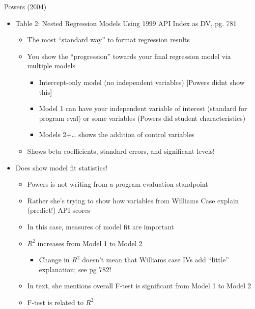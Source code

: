 \documentclass[
  8pt,
  ignorenonframetext,
  dvipsnames]{beamer}
\providecommand{\tightlist}{%
  \setlength{\itemsep}{0pt}\setlength{\parskip}{0pt}}
\let\olditem\item
\renewcommand{\item}{%
  \olditem\vspace{4pt}
}
\begin{document}
\begin{frame}{Powers (2004)}
\protect\hypertarget{powers-2004-1}{}

\begin{itemize}
\tightlist
\item
  Table 2: Nested Regression Models Using 1999 API Index as DV, pg. 781

  \begin{itemize}
  \tightlist
  \item
    The most ``standard way'' to format regression results
  \item
    You show the ``progression'' towards your final regression model via
    multiple models

    \begin{itemize}
    \tightlist
    \item
      Intercept-only model (no independent variables) {[}Powers didnt
      show this{]}
    \item
      Model 1 can have your independent variable of interest (standard
      for program eval) or some variables (Powers did student
      characteristics)
    \item
      Models 2+\ldots{} shows the addition of control variables
    \end{itemize}
  \item
    Shows beta coefficients, standard errors, and significant levels!
  \end{itemize}
\item
  Does show model fit statistics!

  \begin{itemize}
  \tightlist
  \item
    Powers is not writing from a program evaluation standpoint
  \item
    Rather she's trying to show how variables from Williams Case explain
    (predict!) API scores
  \item
    In this case, measures of model fit are important
  \item
    \(R^2\) increases from Model 1 to Model 2

    \begin{itemize}
    \tightlist
    \item
      Change in \(R^2\) doesn't mean that Williams case IVs add
      ``little'' explanation; see pg 782!
    \end{itemize}
  \item
    In text, she mentions overall F-test is significant from Model 1 to
    Model 2
  \item
    F-test is related to \(R^2\)


\end{itemize}
\end{itemize}
\end{frame}
\end{document}
